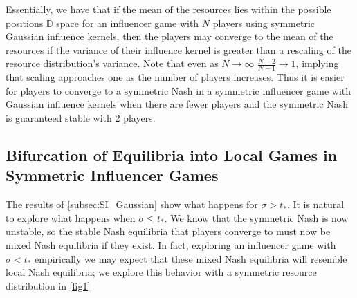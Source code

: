 \documentclass{article}
\begin{document}
            Essentially, we have that if the mean of the resources lies within the possible positions $\mathbb{D}$ space for an influencer game with $N$ players using symmetric Gaussian influence kernels, then the players may converge to the mean of the resources if the variance of their influence kernel is greater than a rescaling of the resource distribution's variance. Note that even as $N\to \infty$ $\frac{N-2}{N-1}\to 1$, implying that scaling approaches one as the number of players increases. Thus it is easier for players to converge to a symmetric Nash in a symmetric influencer game with Gaussian influence kernels when there are fewer players and the symmetric Nash is guaranteed stable with 2 players. 
            
        \subsection{Bifurcation of Equilibria into Local Games in Symmetric Influencer Games}
            The results of \cref{subsec:SI_Gaussian} show what happens for $\sigma>t_*$. It is natural to explore what happens when $\sigma \leq t_*$. We know that the symmetric Nash is now unstable, so the stable Nash equilibria that players converge to must now be mixed Nash equilibria if they exist. In fact, exploring an influencer game with $\sigma<t_*$ empirically we may expect that these mixed Nash equilibria will resemble local Nash equilibria; we explore this behavior with a symmetric resource distribution in \cref{fig1}
\end{document}
